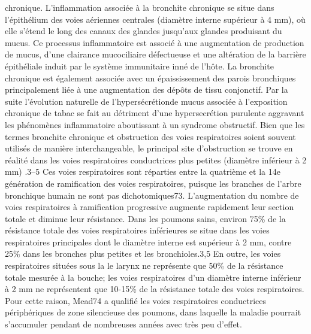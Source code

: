 \documentclass[12pt,]{article}
\begin{document}
chronique. L'inflammation associée à la bronchite chronique se situe
dans l'épithélium des voies aériennes centrales (diamètre interne
supérieur à 4 mm), où elle s'étend le long des canaux des glandes
jusqu'aux glandes produisant du mucus. Ce processus inflammatoire est
associé à une augmentation de production de mucus, d'une clairance
mucociliaire défectueuse et une altération de la barrière épithéliale
induit par le système immunitaire inné de l'hôte. La bronchite chronique
est également associée avec un épaississement des parois bronchiques
principalement liée à une augmentation des dépôts de tissu conjonctif.
Par la suite l'évolution naturelle de l'hypersécrétionde mucus associée
à l'exposition chronique de tabac se fait au détriment d'une
hypersecrétion purulente aggravant les phénomènes inflammatoire
aboutissant à un syndrome obstructif. Bien que les termes bronchite
chronique et obstruction des voies respiratoires soient souvent utilisés
de manière interchangeable, le principal site d'obstruction se trouve en
réalité dans les voies respiratoires conductrices plus petites (diamètre
inférieur à 2 mm) .3--5 Ces voies respiratoires sont réparties entre la
quatrième et la 14e génération de ramification des voies respiratoires,
puisque les branches de l'arbre bronchique humain ne sont pas
dichotomiques73. L'augmentation du nombre de voies respiratoires à
ramification progressive augmente rapidement leur section totale et
diminue leur résistance. Dans les poumons sains, environ 75\% de la
résistance totale des voies respiratoires inférieures se situe dans les
voies respiratoires principales dont le diamètre interne est supérieur à
2 mm, contre 25\% dans les bronches plus petites et les bronchioles.3,5
En outre, les voies respiratoires situées sous la le larynx ne
représente que 50\% de la résistance totale mesurée à la bouche; les
voies respiratoires d'un diamètre interne inférieur à 2 mm ne
représentent que 10-15\% de la résistance totale des voies
respiratoires. Pour cette raison, Mead74 a qualifié les voies
respiratoires conductrices périphériques de zone silencieuse des
poumons, dans laquelle la maladie pourrait s'accumuler pendant de
nombreuses années avec très peu d'effet.
\end{document}
